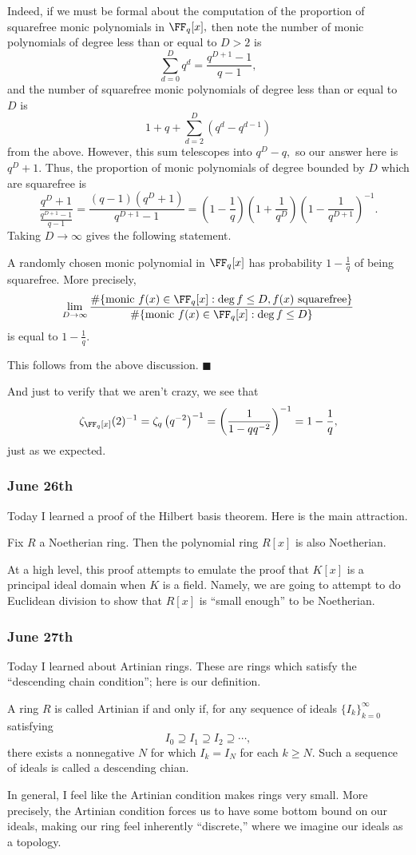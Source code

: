 Indeed, if we must be formal about the computation of the proportion of squarefree monic polynomials in $\FF_q[x],$ then note the number of monic polynomials of degree less than or equal to $D>2$ is
\[\sum_{d=0}^Dq^d=\frac{q^{D+1}-1}{q-1},\]
and the number of squarefree monic polynomials of degree less than or equal to $D$ is
\[1+q+\sum_{d=2}^D\left(q^d-q^{d-1}\right)\]
from the above. However, this sum telescopes into $q^D-q,$ so our answer here is $q^D+1.$ Thus, the proportion of monic polynomials of degree bounded by $D$ which are squarefree is
\[\frac{q^D+1}{\frac{q^{D+1}-1}{q-1}}=\frac{(q-1)\left(q^D+1\right)}{q^{D+1}-1}=\left(1-\frac1q\right)\left(1+\frac1{q^D}\right)\left(1-\frac1{q^{D+1}}\right)^{-1}.\]
Taking $D\to\infty$ gives the following statement.
\begin{theorem}
    A randomly chosen monic polynomial in $\FF_q[x]$ has probability $1-\frac1q$ of being squarefree. More precisely,
    \[\lim_{D\to\infty}\frac{\#\{\text{monic }f(x)\in\FF_q[x]:\deg f\le D,f(x)\text{ squarefree}\}}{\#\{\text{monic }f(x)\in\FF_q[x]:\deg f\le D\}}\]
    is equal to $1-\frac1q.$
\end{theorem}
This follows from the above discussion. $\blacksquare$

And just to verify that we aren't crazy, we see that
\[\zeta_{\FF_q[x]}(2)^{-1}=\zeta_q\left(q^{-2}\right)^{-1}=\left(\frac1{1-qq^{-2}}\right)^{-1}=1-\frac1q,\]
just as we expected.

\subsubsection{June 26th}
Today I learned a proof of the Hilbert basis theorem. Here is the main attraction.
\begin{theorem}
    Fix $R$ a Noetherian ring. Then the polynomial ring $R[x]$ is also Noetherian.
\end{theorem}
At a high level, this proof attempts to emulate the proof that $K[x]$ is a principal ideal domain when $K$ is a field. Namely, we are going to attempt to do Euclidean division to show that $R[x]$ is ``small enough'' to be Noetherian.

\subsubsection{June 27th}
Today I learned about Artinian rings. These are rings which satisfy the ``descending chain condition''; here is our definition.
\begin{definition}
    A ring $R$ is called Artinian if and only if, for any sequence of ideals $\{I_k\}_{k=0}^\infty$ satisfying
    \[I_0\supseteq I_1\supseteq I_2\supseteq\cdots,\]
    there exists a nonnegative $N$ for which $I_k=I_N$ for each $k\ge N.$ Such a sequence of ideals is called a descending chian.
\end{definition}
In general, I feel like the Artinian condition makes rings very small. More precisely, the Artinian condition forces us to have some bottom bound on our ideals, making our ring feel inherently ``discrete,'' where we imagine our ideals as a topology.

